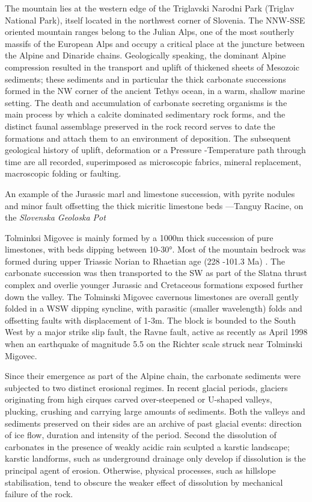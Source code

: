 The mountain lies at the western edge of the Triglavski Narodni Park (Triglav National Park), itself located in the northwest corner of Slovenia. The NNW-SSE oriented mountain ranges belong to the Julian Alps, one of the most southerly massifs of the European Alps and occupy a critical place at the juncture between the Alpine and Dinaride chains. Geologically speaking, the dominant Alpine compression resulted in the transport and uplift of thickened sheets of Mesozoic sediments; these sediments and in particular the thick carbonate successions formed in the NW corner of the ancient Tethys ocean, in a warm, shallow marine setting. The death and accumulation of carbonate secreting organisms is the main process by which a calcite dominated sedimentary rock forms, and the distinct faunal assemblage preserved in the rock record serves to date the formations and attach them to an environment of deposition. The subsequent geological history of uplift, deformation or a Pressure -Temperature path through time are all recorded, superimposed as microscopic fabrics, mineral replacement, macroscopic folding or faulting.  \begin{marginfigure}
\checkoddpage \ifoddpage \forcerectofloat \else \forceversofloat \fi
\centering
 \caption{An example of the Jurassic marl and limestone succession, with pyrite nodules and minor fault offsetting the thick micritic limestone beds ---Tanguy Racine, on the \emph{Slovenska Geoloska Pot}}
 \label{marls and limestones}
\end{marginfigure}

Tolminksi Migovec is mainly formed by a 1000m thick succession of pure limestones, with beds dipping between 10-30°. Most of the mountain bedrock was formed during upper Triassic Norian to Rhaetian age (228 -101.3 Ma) . The carbonate succession was then transported to the SW as part of the Slatna thrust complex and overlie younger Jurassic and Cretaceous formations exposed further down the valley. The Tolminski Migovec cavernous limestones are overall gently folded in a WSW dipping syncline, with parasitic (smaller wavelength) folds and offsetting faults with displacement of 1-3m. The block is bounded to the South West by a major strike slip fault, the Ravne fault, active as recently as April 1998 when an earthquake of magnitude 5.5 on the Richter scale struck near Tolminski Migovec.

Since their emergence as part of the Alpine chain, the carbonate sediments were subjected to two distinct erosional regimes. In recent glacial periods, glaciers originating from high cirques carved over-steepened or U-shaped valleys, plucking, crushing and carrying large amounts of sediments. Both the valleys and sediments preserved on their sides are an archive of past glacial events: direction of ice flow, duration and intensity of the period. Second the dissolution of carbonates in the presence of weakly acidic rain sculpted a karstic landscape; karstic landforms, such as underground drainage only develop if dissolution is the principal agent of erosion. Otherwise, physical processes, such as hillslope stabilisation, tend to obscure the weaker effect of dissolution by mechanical failure of the rock.

